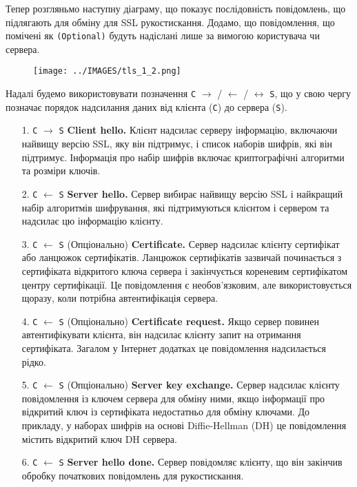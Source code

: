 Тепер розгляньмо наступну діаграму, що показує послідовність повідомлень, що підлягають для обміну для SSL рукостискання. Додамо, що повідомлення, що помічені як \texttt{(Optional)} будуть надіслані лише за вимогою користувача чи сервера.
\begin{figure}[ht]
        \centering
        \texttt{[image: ../IMAGES/tls\_1\_2.png]}
        \label{tls_1_2}
\end{figure}
Надалі будемо використовувати позначення \texttt{C} $\longrightarrow$ / $\longleftarrow$ / $\longleftrightarrow$ \texttt{S}, що у свою чергу позначає порядок надсилання даних від клієнта (\texttt{C}) до сервера (\texttt{S}).
\begin{enumerate}
    \item[1. \texttt{С} $\longrightarrow$ \texttt{S}] \textbf{Client hello.} Клієнт надсилає серверу інформацію, включаючи найвищу версію SSL, яку він підтримує, і список наборів шифрів, які він підтримує. Інформація про набір шифрів включає криптографічні алгоритми та розміри ключів.
    \item[2. \texttt{С} $\longleftarrow$ \texttt{S}] \textbf{Server hello.} Сервер вибирає найвищу версію SSL і найкращий набір алгоритмів шифрування, які підтримуються клієнтом і сервером та надсилає цю інформацію клієнту.
    \item[3. \texttt{С} $\longleftarrow$ \texttt{S}] (Опціонально) \textbf{Certificate.} Сервер надсилає клієнту сертифікат або ланцюжок сертифікатів. Ланцюжок сертифікатів зазвичай починається з сертифіката відкритого ключа сервера і закінчується кореневим сертифікатом центру сертифікації. Це повідомлення є необов'язковим, але використовується щоразу, коли потрібна автентифікація сервера.
    \item[4. \texttt{С} $\longleftarrow$ \texttt{S}] (Опціонально) \textbf{Certificate request.} Якщо сервер повинен автентифікувати клієнта, він надсилає клієнту запит на отримання сертифіката. Загалом у Інтернет додатках це повідомлення надсилається рідко.
    \item[5. \texttt{С} $\longleftarrow$ \texttt{S}] (Опціонально) \textbf{Server key exchange.} Сервер надсилає клієнту повідомлення із ключем сервера для обміну ними, якщо інформації про відкритий ключ із сертифіката недостатньо для обміну ключами. До прикладу, у наборах шифрів на основі Diffie-Hellman (DH) це повідомлення містить відкритий ключ DH сервера.
    \item[6. \texttt{С} $\longleftarrow$ \texttt{S}] \textbf{Server hello done.} Сервер повідомляє клієнту, що він закінчив обробку початкових повідомлень для рукостискання.

\end{enumerate}
